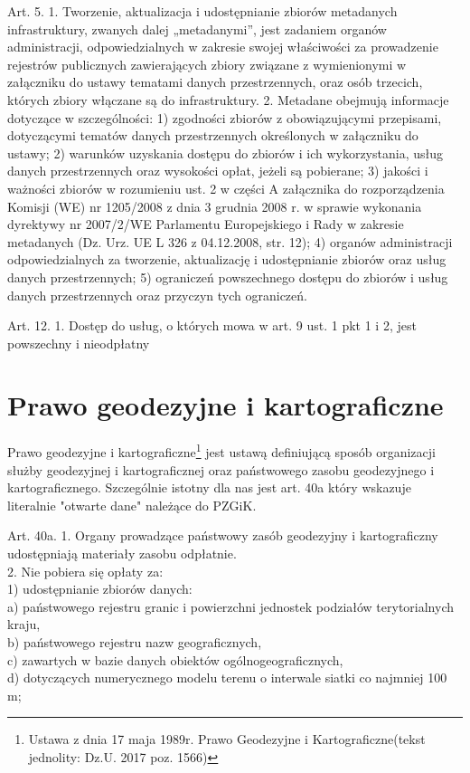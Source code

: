 \begin{prawne}
Art. 5. 1. Tworzenie, aktualizacja i udostępnianie zbiorów metadanych infrastruktury, zwanych dalej „metadanymi”, jest zadaniem organów administracji, odpowiedzialnych w zakresie swojej właściwości za prowadzenie rejestrów publicznych zawierających zbiory związane z wymienionymi w załączniku do ustawy tematami danych przestrzennych, oraz osób trzecich, których zbiory włączane są do infrastruktury.
2. Metadane obejmują informacje dotyczące w szczególności:
1) zgodności zbiorów z obowiązującymi przepisami, dotyczącymi tematów danych
przestrzennych określonych w załączniku do ustawy;
2) warunków uzyskania dostępu do zbiorów i ich wykorzystania, usług danych przestrzennych oraz wysokości opłat, jeżeli są pobierane;
3) jakości i ważności zbiorów w rozumieniu ust. 2 w części A załącznika do rozporządzenia Komisji (WE) nr 1205/2008 z dnia 3 grudnia 2008 r. w sprawie wykonania dyrektywy nr 2007/2/WE Parlamentu Europejskiego i Rady
w zakresie metadanych (Dz. Urz. UE L 326 z 04.12.2008, str. 12);
4) organów administracji odpowiedzialnych za tworzenie, aktualizację i udostępnianie zbiorów oraz usług danych przestrzennych;
5) ograniczeń powszechnego dostępu do zbiorów i usług danych przestrzennych oraz przyczyn tych ograniczeń.	
\end{prawne}
\begin{prawne}
Art. 12. 1. Dostęp do usług, o których mowa w art. 9 ust. 1 pkt 1 i 2, jest powszechny i nieodpłatny
\end{prawne}
\section{Prawo geodezyjne i kartograficzne}
Prawo geodezyjne i kartograficzne\footnote{Ustawa z dnia 17 maja 1989r. Prawo Geodezyjne i Kartograficzne(tekst jednolity: Dz.U. 2017 poz. 1566)} jest ustawą definiującą sposób organizacji służby geodezyjnej i kartograficznej oraz państwowego zasobu geodezyjnego i kartograficznego. Szczególnie istotny dla nas jest art. 40a który wskazuje literalnie "otwarte dane" należące do PZGiK.

\begin{prawne}
	Art. 40a. 1. Organy prowadzące państwowy zasób geodezyjny i kartograficzny udostępniają materiały zasobu odpłatnie.
	\\2. Nie pobiera się opłaty za:
	\\1) udostępnianie zbiorów danych:
\\	a) państwowego rejestru granic i powierzchni jednostek podziałów terytorialnych kraju,
\\	b) państwowego rejestru nazw geograficznych,
\\	c) zawartych w bazie danych obiektów ogólnogeograficznych,
\\	d) dotyczących numerycznego modelu terenu o interwale siatki co najmniej 100 m;
\end{prawne}


